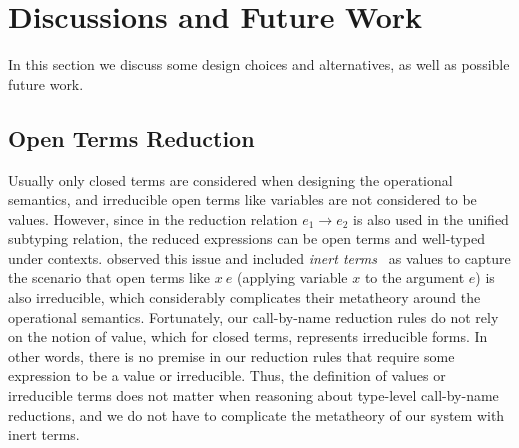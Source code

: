 \section{Discussions and Future Work}

In this section we discuss some design choices and alternatives, as well
as possible future work.

\subsection{Open Terms Reduction}
\label{sec:open-term-reduction}

Usually only closed terms are considered when designing the operational semantics,
and irreducible open terms like variables are not considered to be values.
However, since in \name the reduction relation $e_1 \longrightarrow e_2$ is also
used in the unified subtyping relation, the reduced expressions can be open terms and well-typed under contexts.
\citet{full} observed this issue and included \emph{inert terms}~\citep{opencbv} as values
to capture the scenario that open terms like $x~e$
(applying variable $x$ to the argument $e$) is also irreducible, which considerably
complicates their metatheory around the operational semantics.
Fortunately, our call-by-name reduction rules do not rely on the notion of value,
which for closed terms, represents irreducible forms.
In other words, there is no premise in our reduction rules that require
some expression to be a value or irreducible.
Thus, the definition of values or irreducible terms does not matter when reasoning about
type-level call-by-name reductions, and we do not have to complicate the metatheory of our system
with inert terms.


